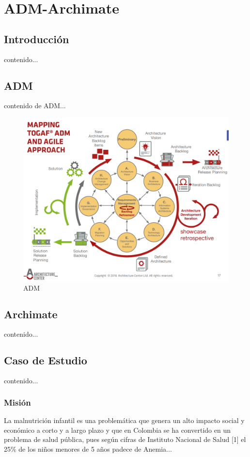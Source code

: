 \chapter{ADM-Archimate}
\section{Introducción}
contenido...
\newpage

\section{ADM}
contenido de ADM...

\begin{figure}[h!]
	\centering
	\includegraphics[width=0.7\linewidth]{ARQUITECTURA/imgs/adm}
	\caption{ADM \cite{SB,1579133,6337726,6337730,6827125}}
\end{figure}


\newpage

\section{Archimate}
contenido...

\newpage

\section{Caso de Estudio}
contenido...

\subsection{Misión}
La malnutrición infantil es una problemática que genera un alto impacto social y económico a corto y a largo plazo y que en Colombia se ha convertido en un problema de salud pública, pues según cifras de Instituto Nacional de Salud [1] el 25\% de los niños menores de 5 años padece de Anemia...
